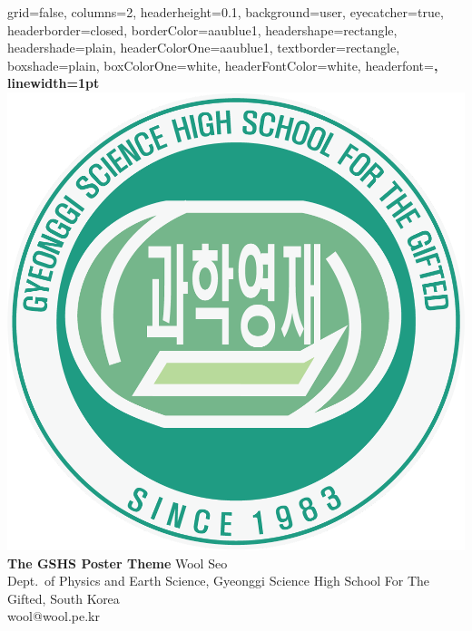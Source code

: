 \documentclass[a0paper,portrait]{baposter}
\begin{document}
\begin{poster}{
  grid=false,
  columns=2,
  headerheight=0.1\textheight,
  background=user,
  eyecatcher=true,
  headerborder=closed,
  borderColor=aaublue1,
  headershape=rectangle,
  headershade=plain,
  headerColorOne=aaublue1,
  textborder=rectangle,
  boxshade=plain,
  boxColorOne=white,
  headerFontColor=white,
  headerfont=\Large\sf\bf,
  linewidth=1pt
}
{
  \includegraphics[height=0.75\headerheight]{./logo/gshslogo_green.png}
}
{\color{white}\bf
  The GSHS Poster Theme
}
{\color{white}\small
  \vspace{1em} Wool Seo\\[0.5em]
  Dept.\ of Physics and Earth Science, Gyeonggi Science High School For The Gifted, South Korea\\
  wool@wool.pe.kr
}
{
}
\end{poster}
\end{document}
